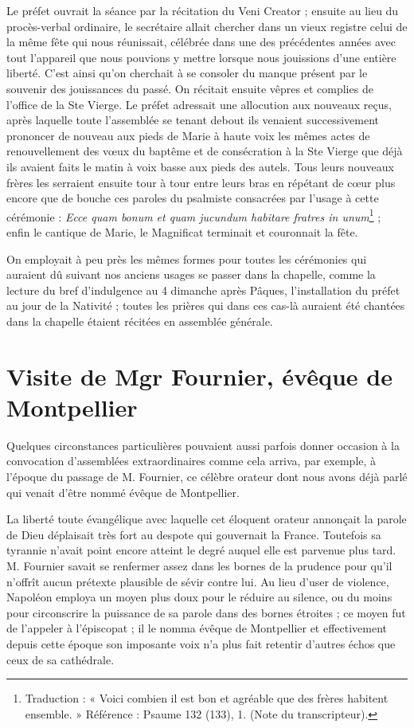 Le préfet ouvrait la séance par la récitation du Veni Creator ; ensuite au lieu du procès-verbal ordinaire, le secrétaire allait chercher dans un vieux registre celui de la même fête qui nous réunissait, célébrée dans une des précédentes années avec tout l'appareil que nous pouvions y mettre lorsque nous jouissions d'une entière liberté. C'est ainsi qu'on cherchait à se consoler du manque présent par le souvenir des jouissances du passé. On récitait ensuite vêpres et complies de l'office de la Ste Vierge. Le préfet adressait une allocution aux nouveaux reçus, après laquelle toute l'assemblée se tenant debout ils venaient successivement prononcer de nouveau aux pieds de Marie à haute voix les mêmes actes de renouvellement des vœux du baptême et de consécration à la Ste Vierge que déjà ils avaient faits le matin à voix basse aux pieds des autels. Tous leurs nouveaux frères les serraient ensuite tour à tour entre leurs bras en répétant de cœur plus encore que de bouche ces paroles du psalmiste consacrées par l'usage à cette cérémonie : \textit{Ecce quam bonum et quam jucundum habitare fratres in unum}\footnote{Traduction : « Voici combien il est bon et agréable que des frères habitent ensemble. » Référence : Psaume 132 (133), 1. (Note du transcripteur).} ; enfin le cantique de Marie, le Magnificat terminait et couronnait la fête.

On employait à peu près les mêmes formes pour toutes les cérémonies qui auraient dû suivant nos anciens usages se passer dans la chapelle, comme la lecture du bref d'indulgence au 4 dimanche après Pâques, l'installation du préfet au jour de la Nativité ; toutes les prières qui dans ces cas-là auraient été chantées dans la chapelle étaient récitées en assemblée générale.

\section*{Visite de Mgr Fournier, évêque de Montpellier}
Quelques circonstances particulières pouvaient aussi parfois donner occasion à la convocation d'assemblées extraordinaires comme cela arriva, par exemple, à l'époque du passage de M. Fournier, ce célèbre orateur dont nous avons déjà parlé qui venait d'être nommé évêque de Montpellier.

La liberté toute évangélique avec laquelle cet éloquent orateur annonçait la parole de Dieu déplaisait très fort au despote qui gouvernait la France. Toutefois sa tyrannie n'avait point encore atteint le degré auquel elle est parvenue plus tard. M. Fournier savait se renfermer assez dans les bornes de la prudence pour qu'il n'offrît aucun prétexte plausible de sévir contre lui. Au lieu d'user de violence, Napoléon employa un moyen plus doux pour le réduire au silence, ou du moins pour circonscrire la puissance de sa parole dans des bornes étroites ; ce moyen fut de l'appeler à l'épiscopat ; il le nomma évêque de Montpellier et effectivement depuis cette époque son imposante voix n'a plus fait retentir d'autres échos que ceux de sa cathédrale.

